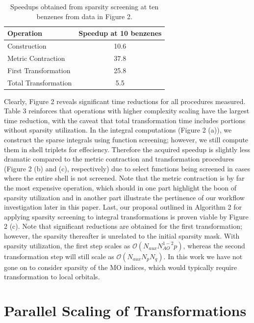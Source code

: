 \begingroup
\begin{table}[H]
\centering
\renewcommand{\baselinestretch}{1}
\caption{Speedups obtained from sparsity screening at ten benzenes from data in Figure 2.}
\begin{tabular}{l c}
\multicolumn{1}{l}{\textbf{Operation}} &
\multicolumn{1}{c}{\textbf{Speedup at 10 benzenes}} \\ 
\hline
Construction          & 10.6  \\          
Metric Contraction    & 37.8  \\          
First Transformation  & 25.8  \\          
Total Transformation  & 5.5  \\          
\end{tabular}
\end{table}
\endgroup


Clearly, Figure 2 reveals significant time reductions for all procedures measured.
Table 3 reinforces that operations with higher complexity scaling have the largest time
reduction, with the caveat that total transformation time includes portions without sparsity utilization.
In the integral computations (Figure 2 (a)), we construct the sparse integrals using
function screening; however, we still compute them in shell triplets for effeciency.
Therefore the acquired speedup is slightly less dramatic compared to the metric contraction and
transformation procedures (Figure 2 (b) and (c), respectively) due to select functions being 
screened in cases where the entire shell is not screened. 
Note that the metric contraction is by far the most expensive operation, which should in one part
highlight the boon of sparsity utilization and in another part
illustrate the pertinence of our workflow investigation later in this paper.
Last, our proposal outlined in Algorithm 2 for applying sparsity screening to integral transformations
is proven viable by Figure 2 (c).  Note that significant reductions are obtained for the
first transformation; however, the sparsity thereafter is unrelated to the initial sparsity
mask. With sparsity utilization, the first step scales as $\mathcal{O}(N_{aux}N_{AO}^{1-2}p)$,
whereas the second transformation step will still scale as $\mathcal{O}(N_{aux}N_pN_q)$.
In this work we have not gone on to consider sparsity of the MO indices, which would 
typically require transformation to local orbitals.


\section{Parallel Scaling of Transformations}

